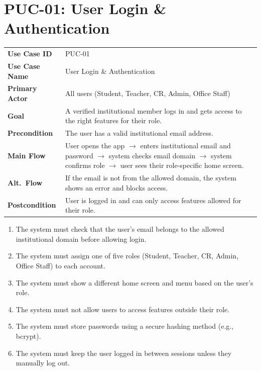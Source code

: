 \documentclass[12pt,a4paper]{article}
\begin{document}

\newpage
\section{PUC-01: User Login \& Authentication}

\begin{tcolorbox}[pucbox, title={Product Use Case --- PUC-01}]
\begin{tabularx}{\linewidth}{p{3.5cm} X}
\textbf{Use Case ID}    & PUC-01 \\
\textbf{Use Case Name}  & User Login \& Authentication \\
\textbf{Primary Actor}  & All users (Student, Teacher, CR, Admin, Office Staff) \\
\textbf{Goal}           & A verified institutional member logs in and gets access to the right features for their role. \\
\textbf{Precondition}   & The user has a valid institutional email address. \\
\textbf{Main Flow}      & User opens the app $\rightarrow$ enters institutional email and password $\rightarrow$ system checks email domain $\rightarrow$ system confirms role $\rightarrow$ user sees their role-specific home screen. \\
\textbf{Alt.\ Flow}     & If the email is not from the allowed domain, the system shows an error and blocks access. \\
\textbf{Postcondition}  & User is logged in and can only access features allowed for their role. \\
\end{tabularx}
\end{tcolorbox}

\begin{tcolorbox}[frbox, title={Functional Requirements --- PUC-01}]
\begin{enumerate}[leftmargin=*, label=\textbf{FR-01.\arabic*}, itemsep=5pt]
  \item The system must check that the user's email belongs to the allowed institutional domain before allowing login.
  \item The system must assign one of five roles (Student, Teacher, CR, Admin, Office Staff) to each account.
  \item The system must show a different home screen and menu based on the user's role.
  \item The system must not allow users to access features outside their role.
  \item The system must store passwords using a secure hashing method (e.g., bcrypt).
  \item The system must keep the user logged in between sessions unless they manually log out.
\end{enumerate}
\end{tcolorbox}
\end{document}
